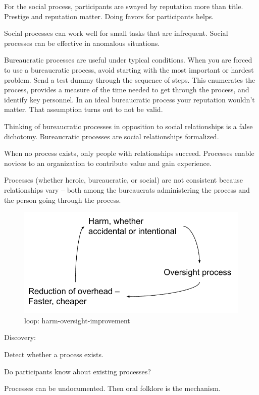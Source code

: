 For the social process, participants are swayed by reputation more than title. Prestige and reputation matter. Doing favors for participants helps.

Social processes can work well for small tasks that are infrequent.
Social processes can be effective in anomalous situations.

Bureaucratic processes are useful under typical conditions.
When you are forced to use a bureaucratic process, avoid starting with the most important or hardest problem. Send a test dummy through the sequence of steps. This enumerates the process, provides a measure of the time needed to get through the process, and identify key personnel. In an ideal bureaucratic process your reputation wouldn't matter. That assumption turns out to not be valid. 

Thinking of bureaucratic processes in opposition to social relationships is a false dichotomy. Bureaucratic processes are social relationships formalized.



When no process exists, only people with relationships succeed. Processes enable novices to an organization to contribute value and gain experience. 



Processes (whether heroic, bureaucratic, or social) are not consistent because relationships vary -- both among the bureaucrats administering the process and the person going through the process.






\begin{figure}
    \centering
    \includegraphics{images/process_loop_harm-oversight-improvement}
    \caption{loop: harm-oversight-improvement}
    \label{fig:harm-oversight-improvement}
\end{figure}







Discovery:

Detect whether a process exists. 

Do participants know about existing processes?

Processes can be undocumented. Then oral folklore is the mechanism. 


